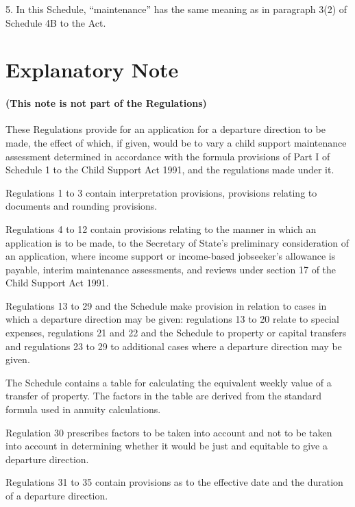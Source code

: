 \documentclass[a4paper]{article}
\newcommand{\parthead}{}
\begin{document}
\medskip

5. In this Schedule, “maintenance” has the same meaning as in paragraph 3(2) of
Schedule 4B to the Act.


\part{Explanatory Note}

\renewcommand\parthead{--- Explanatory Note}

\subsection*{(This note is not part of the Regulations)}

These Regulations provide for an application for a departure direction to be
made, the effect of which, if given, would be to vary a child support
maintenance assessment determined in accordance with the formula provisions of
Part I of Schedule 1 to the Child Support Act 1991, and the regulations made
under it.

Regulations 1 to 3 contain interpretation provisions, provisions relating to
documents and rounding provisions.

Regulations 4 to 12 contain provisions relating to the manner in which an
application is to be made, to the Secretary of State’s preliminary consideration
of an application, where income support or income-based jobseeker’s allowance is
payable, interim maintenance assessments, and reviews under section 17 of the
Child Support Act 1991.

Regulations 13 to 29 and the Schedule make provision in relation to cases in
which a departure direction may be given: regulations 13 to 20 relate to special
expenses, regulations 21 and 22 and the Schedule to property or capital
transfers and regulations 23 to 29 to additional cases where a departure
direction may be given.

The Schedule contains a table for calculating the equivalent weekly value of a
transfer of property. The factors in the table are derived from the standard
formula used in annuity calculations.

Regulation 30 prescribes factors to be taken into account and not to be taken
into account in determining whether it would be just and equitable to give a
departure direction.

Regulations 31 to 35 contain provisions as to the effective date and the
duration of a departure direction.
\end{document}
